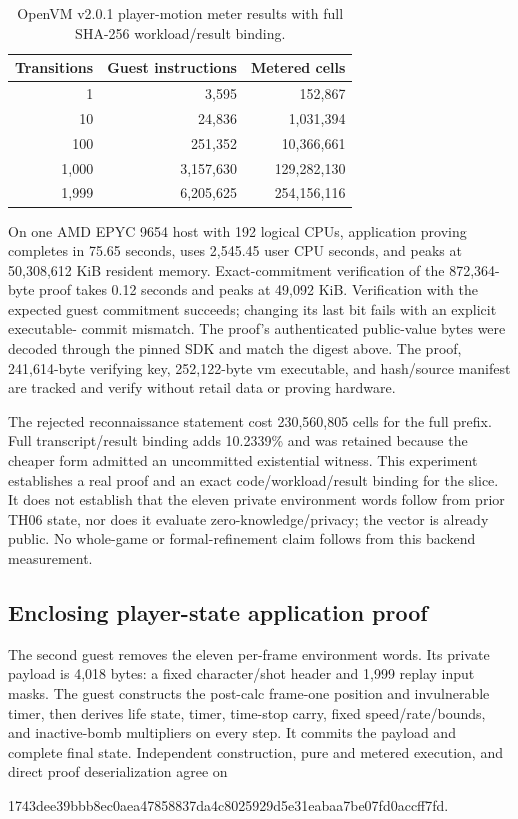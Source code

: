 \begin{table}[h]
  \centering
  \small
  \begin{tabular}{@{}rrr@{}}
    \toprule
    Transitions & Guest instructions & Metered cells \\
    \midrule
    1     & 3,595     & 152,867 \\
    10    & 24,836    & 1,031,394 \\
    100   & 251,352   & 10,366,661 \\
    1,000 & 3,157,630 & 129,282,130 \\
    1,999 & 6,205,625 & 254,156,116 \\
    \bottomrule
  \end{tabular}
  \caption{OpenVM v2.0.1 player-motion meter results with full SHA-256
  workload/result binding.}
  \label{tab:openvm-motion-meter}
\end{table}

On one AMD EPYC 9654 host with 192 logical CPUs, application proving completes
in 75.65 seconds, uses 2,545.45 user CPU seconds, and peaks at 50,308,612 KiB
resident memory.  Exact-commitment verification of the 872,364-byte proof takes
0.12 seconds and peaks at 49,092 KiB.  Verification with the expected guest
commitment succeeds; changing its last bit fails with an explicit executable-
commit mismatch.  The proof's authenticated public-value bytes were decoded
through the pinned SDK and match the digest above.  The proof, 241,614-byte
verifying key, 252,122-byte vm executable, and hash/source manifest are tracked
and verify without retail data or proving hardware.

The rejected reconnaissance statement cost 230,560,805 cells for the full
prefix.  Full transcript/result binding adds 10.2339\% and was retained because
the cheaper form admitted an uncommitted existential witness.  This experiment
establishes a real proof and an exact code/workload/result binding for the
slice.  It does not establish that the eleven private environment words follow
from prior TH06 state, nor does it evaluate zero-knowledge/privacy; the vector
is already public.  No whole-game or formal-refinement claim follows from this
backend measurement.

\subsection{Enclosing player-state application proof}

The second guest removes the eleven per-frame environment words.  Its private
 payload is 4,018 bytes: a fixed character/shot header and 1,999
replay input masks.  The guest constructs the post-calc frame-one position and
invulnerable timer, then derives life state, timer, time-stop carry, fixed
speed/rate/bounds, and inactive-bomb multipliers on every step.  It commits the
payload and complete final state.  Independent construction, pure and metered
execution, and direct proof deserialization agree on
\begin{center}
\small\ttfamily
1743dee39bbb8ec0aea47858837da4c8025929d5e31eabaa7be07fd0accff7fd.
\end{center}

